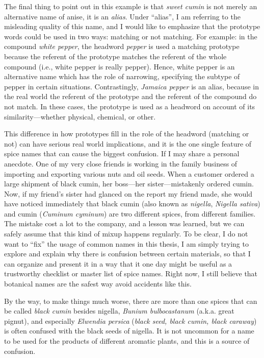 The final thing to point out in this example is that \textit{sweet cumin} is not merely an alternative name of anise, it is an \textit{alias}. Under ``alias'', I am referring to the misleading quality of this name, and I would like to emphasize that the prototype words could be used in two ways: matching or not matching. For example: in the compound \textit{white pepper}, the headword \textit{pepper} is used a matching prototype because the referent of the prototype matches the referent of the whole compound (i.e., white pepper is really pepper). Hence, white pepper is an alternative name which has the role of narrowing, specifying the subtype of pepper in certain situations. Contrastingly, \textit{Jamaica pepper} is an alias, because in the real world the referent of the prototype and the referent of the compound do not match. In these cases, the prototype is used as a headword on account of its similarity---whether physical, chemical, or other.

This difference in how prototypes fill in the role of the headword (matching or not) can have serious real world implications, and it is the one single feature of spice names that can cause the biggest confusion. If I may share a personal anecdote. One of my very close friends is working in the family business of importing and exporting various nuts and oil seeds. When a customer ordered a large shipment of black cumin, her boss---her sister---mistakenly ordered cumin. Now, if my friend's sister had glanced on the report my friend made, she would have noticed immediately that black cumin (also known as \textit{nigella}, \textit{Nigella sativa}) and cumin (\textit{Cuminum cyminum}) are two different spices, from different families. The mistake cost a lot to the company, and a lesson was learned, but we can safely assume that this kind of mixup happens regularly. To be clear, I do not want to ``fix'' the usage of common names in this thesis, I am simply trying to explore and explain why there is confusion between certain materials, so that I can organize and present it in a way that it one day might be useful as a trustworthy checklist or master list of spice names. Right now, I still believe that botanical names are the safest way avoid accidents like this. 

By the way, to make things much worse, there are more than one spices that can be called \textit{black cumin} besides nigella, \textit{Bunium bulbocastanum} (a.k.a. great pignut), and especially \textit{Elwendia persica} (\textit{black seed, black cumin, black caraway}) is often confused with the black seeds of nigella. It is not uncommon for a name to be used for the products of different aromatic plants, and this is a source of confusion.

